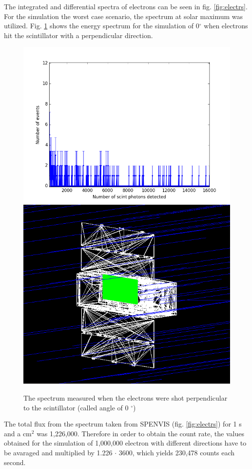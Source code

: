\documentclass[12pt, a4paper,titlepage]{article}
\numberwithin{equation}{section}
\numberwithin{figure}{section}
\begin{document}
The integrated and differential spectra of electrons can be seen in fig. \ref{fig:electrs}. For the simulation the worst case scenario, the spectrum at solar maximum was utilized. Fig. \ref{fig:iii} shows the energy spectrum for the simulation of 0$^{\circ}$ when electrons hit the scintillator with a perpendicular direction. 

\begin{figure}[h!]
\centering %
\includegraphics[width=.55\textwidth,origin=c,angle=0]{images/electrons0degspectra.png}
\qquad
\includegraphics[width=.4\textwidth,origin=c,angle=90]{images/0mac.png} 
\caption{\label{fig:iii} The spectrum measured when the electrons were shot perpendicular to the scintillator (called angle of 0 $^{\circ}$)}
\end{figure}

\pagebreak

The total flux from the spectrum taken from SPENVIS (fig. \ref{fig:electrs}) for 1 s and a cm$^{2}$ was 1,226,000. Therefore in order to obtain the count rate, the values obtained for the simulation of 1,000,000 electron with different directions have to be avaraged and multiplied by 1.226 $\cdot$ 3600, which yields 230,478 counts each second.
\end{document}

